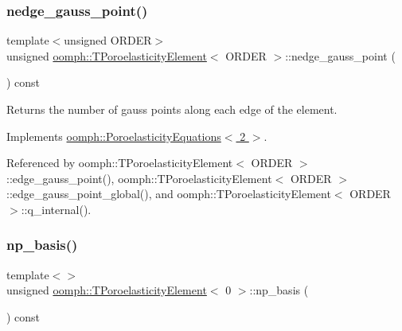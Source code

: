 \subsubsection{\texorpdfstring{nedge\+\_\+gauss\+\_\+point()}{nedge\_gauss\_point()}\hspace{0.1cm}{\footnotesize\ttfamily [3/3]}}
{\footnotesize\ttfamily template$<$unsigned O\+R\+D\+ER$>$ \\
unsigned \hyperlink{classoomph_1_1TPoroelasticityElement}{oomph\+::\+T\+Poroelasticity\+Element}$<$ O\+R\+D\+ER $>$\+::nedge\+\_\+gauss\+\_\+point (\begin{DoxyParamCaption}{ }\end{DoxyParamCaption}) const\hspace{0.3cm}{\ttfamily [virtual]}}



Returns the number of gauss points along each edge of the element. 



Implements \hyperlink{classoomph_1_1PoroelasticityEquations_aa01b0fb38667776634b5f33bf8859886}{oomph\+::\+Poroelasticity\+Equations$<$ 2 $>$}.



Referenced by oomph\+::\+T\+Poroelasticity\+Element$<$ O\+R\+D\+E\+R $>$\+::edge\+\_\+gauss\+\_\+point(), oomph\+::\+T\+Poroelasticity\+Element$<$ O\+R\+D\+E\+R $>$\+::edge\+\_\+gauss\+\_\+point\+\_\+global(), and oomph\+::\+T\+Poroelasticity\+Element$<$ O\+R\+D\+E\+R $>$\+::q\+\_\+internal().

\mbox{\label{classoomph_1_1TPoroelasticityElement_a3befd892c66029500db46a8410f6e34e}} 
\subsubsection{\texorpdfstring{np\+\_\+basis()}{np\_basis()}\hspace{0.1cm}{\footnotesize\ttfamily [1/3]}}
{\footnotesize\ttfamily template$<$$>$ \\
unsigned \hyperlink{classoomph_1_1TPoroelasticityElement}{oomph\+::\+T\+Poroelasticity\+Element}$<$ 0 $>$\+::np\+\_\+basis (\begin{DoxyParamCaption}{ }\end{DoxyParamCaption}) const\hspace{0.3cm}{\ttfamily [virtual]}}



